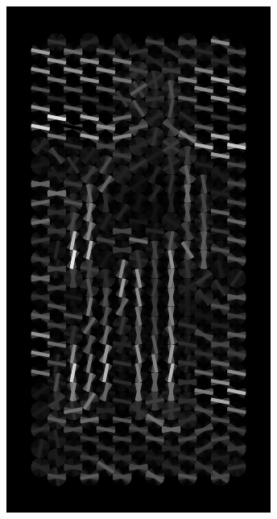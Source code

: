 \documentclass[thesis.tex]{subfiles}
\begin{document}
\begin{figure}
\begin{subfigure}[t]{0.135\textwidth}
		\includegraphics[width=\textwidth]{img/inriaExampleDescriptor.pdf}
		\caption{}
		\vspace{2mm}
	\end{subfigure}
	\begin{subfigure}[t]{0.135\textwidth}

\end{subfigure}
\end{figure}
\end{document}
